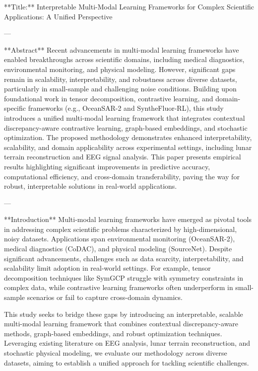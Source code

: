 **Title:** Interpretable Multi-Modal Learning Frameworks for Complex Scientific Applications: A Unified Perspective

---

**Abstract**  
Recent advancements in multi-modal learning frameworks have enabled breakthroughs across scientific domains, including medical diagnostics, environmental monitoring, and physical modeling. However, significant gaps remain in scalability, interpretability, and robustness across diverse datasets, particularly in small-sample and challenging noise conditions. Building upon foundational work in tensor decomposition, contrastive learning, and domain-specific frameworks (e.g., OceanSAR-2 and SyntheFluor-RL), this study introduces a unified multi-modal learning framework that integrates contextual discrepancy-aware contrastive learning, graph-based embeddings, and stochastic optimization. The proposed methodology demonstrates enhanced interpretability, scalability, and domain applicability across experimental settings, including lunar terrain reconstruction and EEG signal analysis. This paper presents empirical results highlighting significant improvements in predictive accuracy, computational efficiency, and cross-domain transferability, paving the way for robust, interpretable solutions in real-world applications.

---

**Introduction**  
Multi-modal learning frameworks have emerged as pivotal tools in addressing complex scientific problems characterized by high-dimensional, noisy datasets. Applications span environmental monitoring (OceanSAR-2), medical diagnostics (CoDAC), and physical modeling (SourceNet). Despite significant advancements, challenges such as data scarcity, interpretability, and scalability limit adoption in real-world settings. For example, tensor decomposition techniques like SymGCP struggle with symmetry constraints in complex data, while contrastive learning frameworks often underperform in small-sample scenarios or fail to capture cross-domain dynamics.

This study seeks to bridge these gaps by introducing an interpretable, scalable multi-modal learning framework that combines contextual discrepancy-aware methods, graph-based embeddings, and robust optimization techniques. Leveraging existing literature on EEG analysis, lunar terrain reconstruction, and stochastic physical modeling, we evaluate our methodology across diverse datasets, aiming to establish a unified approach for tackling scientific challenges.

